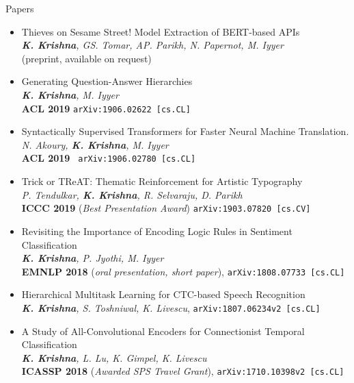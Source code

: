 \documentclass{resume} %
\begin{document}
\begin{rSection}{Papers}
\begin{itemize}[leftmargin=*]
\item Thieves on Sesame Street! Model Extraction of BERT-based APIs \\ \textit{\textbf{K. Krishna}, GS. Tomar, AP. Parikh, N. Papernot, M. Iyyer} \\ (preprint, available on request)
\item Generating Question-Answer Hierarchies \\ \textit{\textbf{K. Krishna}, M. Iyyer} \\ \textbf{ACL 2019} \texttt{arXiv:1906.02622 [cs.CL]}
\item Syntactically Supervised Transformers for Faster Neural Machine Translation. \\ \textit{N. Akoury, \textbf{K. Krishna}, M. Iyyer} \\ \textbf{ACL 2019} \texttt{ 	arXiv:1906.02780 [cs.CL]}
\item Trick or TReAT: Thematic Reinforcement for Artistic Typography \\ \textit{P. Tendulkar, \textbf{K. Krishna}, R. Selvaraju, D. Parikh} \\ \textbf{ICCC 2019} (\textit{Best Presentation Award}) \texttt{arXiv:1903.07820 [cs.CV]} 
\item Revisiting the Importance of Encoding Logic Rules in Sentiment Classification \\ \textit{\textbf{K. Krishna}, P. Jyothi, M. Iyyer} \\ \textbf{EMNLP 2018} (\textit{oral presentation, short paper}), 
\texttt{arXiv:1808.07733 [cs.CL]}
\item Hierarchical Multitask Learning for CTC-based Speech Recognition  \\ \textit{\textbf{K. Krishna}, S. Toshniwal, K. Livescu}, \texttt{arXiv:1807.06234v2 [cs.CL]} 
\item A Study of All-Convolutional Encoders for Connectionist Temporal Classification\\ \textit{\textbf{K. Krishna}, L. Lu, K. Gimpel,  K. Livescu}\\ \textbf{ICASSP 2018} (\textit{Awarded SPS Travel Grant}), \texttt{arXiv:1710.10398v2 [cs.CL]} 
\end{itemize}
\end{rSection}
\end{document}
